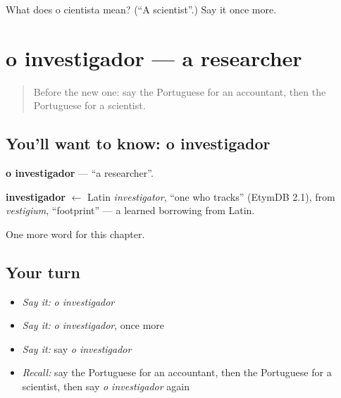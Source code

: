 \begin{tcolorbox}[breakable,colback=teal!4,colframe=teal!35!black,title={Before you move on}]
What does o cientista mean? (\textquotedblleft{}A scientist\textquotedblright{}.) Say it once more.
\end{tcolorbox}
\section[o investigador]{o investigador — a researcher}

\label{lesson:PT-C160-investigador}



\begin{quote}
Before the new one: say the Portuguese for an accountant, then the Portuguese for a scientist.
\end{quote}

\subsection*{You'll want to know: o investigador}
\textbf{o investigador} — \textquotedblleft{}a researcher\textquotedblright{}.

\begin{cousinweb}
\textbf{investigador} $\leftarrow$ Latin \emph{investigator}, \textquotedblleft{}one who tracks\textquotedblright{} (EtymDB 2.1), from \emph{vestigium}, \textquotedblleft{}footprint\textquotedblright{} — a learned borrowing from Latin.
\end{cousinweb}

\begin{grammarlens}[title={What you've built}]
One more word for this chapter.
\end{grammarlens}

\subsection*{Your turn}
\begin{itemize}
\raggedright
  \item \emph{Say it:} \emph{o investigador}
  \item \emph{Say it:} \emph{o investigador}, once more
  \item \emph{Say it:} say \emph{o investigador}
  \item \emph{Recall:} say the Portuguese for an accountant, then the Portuguese for a scientist, then say \emph{o investigador} again
\end{itemize}


